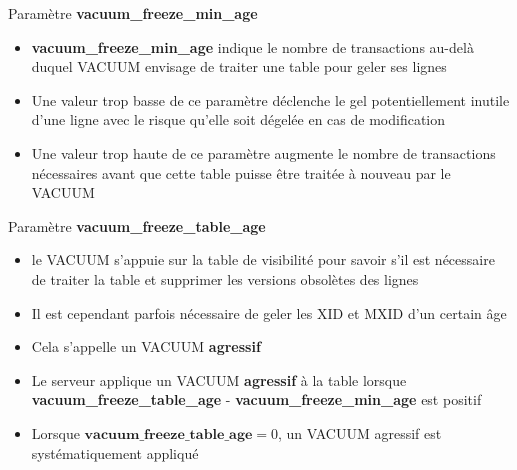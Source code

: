 
\begin{frame}{Paramètre \textbf{vacuum\_freeze\_min\_age}}

\begin{itemize}
   \item \textbf{vacuum\_freeze\_min\_age} indique le nombre de transactions au-delà duquel VACUUM envisage de traiter une table pour geler ses lignes
   \item Une valeur trop basse de ce paramètre déclenche le gel \textsf{potentiellement inutile} d'une ligne avec le risque qu'elle soit dégelée en cas de modification
   \item Une valeur trop haute de ce paramètre augmente le nombre de transactions nécessaires avant que cette table puisse être traitée à nouveau par le VACUUM
\end{itemize}

\begin{toile}
\end{toile}

\end{frame}


\begin{frame}{Paramètre \textbf{vacuum\_freeze\_table\_age}}

\begin{itemize}
   \item le VACUUM s'appuie sur la table de visibilité pour savoir s'il est nécessaire de traiter la table et supprimer les versions obsolètes des lignes
   \item Il est cependant parfois nécessaire de geler les XID et MXID d'un certain âge
   \item Cela s'appelle un VACUUM \textbf{agressif}
   \item Le serveur applique un VACUUM \textbf{agressif} à la table lorsque \textbf{vacuum\_freeze\_table\_age} - \textbf{vacuum\_freeze\_min\_age} est positif
   \item Lorsque $\textbf{vacuum\_freeze\_table\_age} = 0$, un VACUUM agressif est systématiquement appliqué
\end{itemize}

\end{frame}

